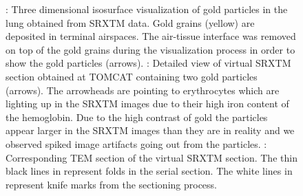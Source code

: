 \begin{figure}[htb]
	\caption[Three dimensional isosurface visualization of gold particles in the lung obtained from SRXTM data]{: Three dimensional isosurface visualization of gold particles in the lung obtained from \ac{SRXTM} data. Gold grains (yellow) are deposited in terminal airspaces. The air-tissue interface was removed on top of the gold grains during the visualization process in order to show the gold particles (arrows). : Detailed view of virtual \ac{SRXTM} section obtained at \ac{TOMCAT} containing two gold particles (arrows). The arrowheads are pointing to erythrocytes which are lighting up in the \ac{SRXTM} images due to their high iron content of the hemoglobin. Due to the high contrast of gold the particles appear larger in the \ac{SRXTM} images than they are in reality and we observed spiked image artifacts going out from the particles. : Corresponding \ac{TEM} section of the virtual \ac{SRXTM} section. The thin black lines in  represent folds in the serial section. The white lines in  represent knife marks from the sectioning process.}
	\label{fig:imaris}
\end{figure}

